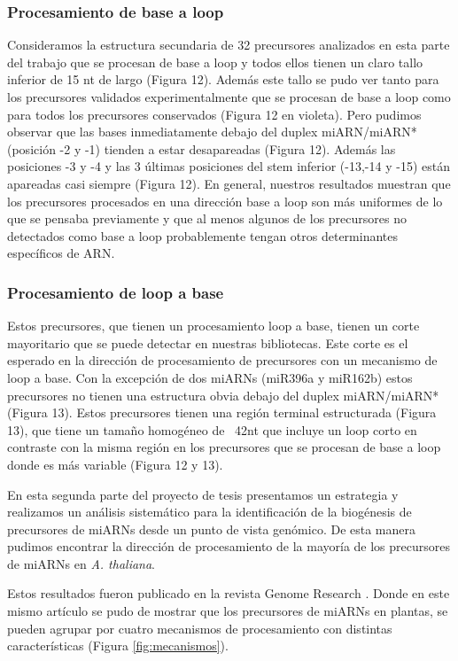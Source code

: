 \subsubsection{Procesamiento de base a loop}

Consideramos la estructura secundaria de 32 precursores analizados en esta parte del trabajo que se procesan de base a loop y todos ellos tienen un claro tallo inferior de 15 nt de largo (Figura 12).
Además este tallo se pudo ver tanto para los precursores validados experimentalmente que se procesan de base a loop como para todos los precursores conservados (Figura 12 en violeta).
Pero pudimos observar que las bases inmediatamente debajo del duplex miARN/miARN* (posición -2 y -1) tienden a estar desapareadas (Figura 12).
Además las posiciones -3 y -4 y las 3 últimas posiciones del stem inferior (-13,-14 y -15) están apareadas casi siempre (Figura 12).
En general, nuestros resultados muestran que los precursores procesados en una dirección base a loop son más uniformes de lo que se pensaba previamente y que al menos algunos de los precursores no detectados como base a loop probablemente tengan otros determinantes específicos de ARN.

\subsubsection{Procesamiento de loop a base}
Estos precursores, que tienen un procesamiento loop a base, tienen un corte mayoritario que se puede detectar en nuestras bibliotecas.
Este corte es el esperado en la dirección de procesamiento de precursores con un mecanismo de loop a base.
Con la excepción de dos miARNs (miR396a y miR162b) estos precursores no tienen una estructura obvia debajo del duplex miARN/miARN* (Figura 13).
Estos precursores tienen una región terminal estructurada (Figura 13), que tiene un tamaño homogéneo de ~42nt que incluye un loop corto en contraste con la misma región en los precursores que se procesan de base a loop donde es más variable (Figura 12 y 13). 

En esta segunda parte del proyecto de tesis presentamos un estrategia y realizamos un análisis sistemático para la identificación de la biogénesis de precursores de miARNs desde un punto de vista genómico.
De esta manera pudimos encontrar la dirección de procesamiento de la mayoría de los precursores de miARNs en \textit{A. thaliana}.

Estos resultados fueron publicado en la revista Genome Research \citep{Bologna2013}.
Donde en este mismo artículo se pudo de mostrar que los precursores de miARNs en plantas, se pueden agrupar por cuatro mecanismos de procesamiento con distintas características (Figura \ref{fig:mecanismos}).

